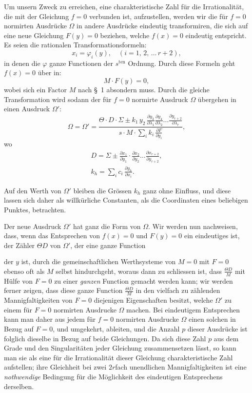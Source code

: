 \documentclass{article}
\begin{document}
Um unsern Zweck zu erreichen, eine charakteristische Zahl für die Irrationalität, die mit der Gleichung $f = 0$ verbunden ist, aufzustellen, werden wir die für $f = 0$ normirten Ausdrücke $\Omega$ in andere Ausdrücke eindeutig transformiren, die sich auf eine neue Gleichung $F(y) = 0$ beziehen, welche $f(x) = 0$ eindeutig entspricht. Es seien die rationalen Transformationsformeln:
\[
x_i = \varphi_i(y), \quad (i = 1,\, 2,\, \dots\, r+2),
\]
in denen die $\varphi$ ganze Functionen der $s^{\text{ten}}$ Ordnung. Durch diese Formeln geht $f(x) = 0$ über in:
\[
M \cdot F(y) = 0,
\]
wobei sich ein Factor $M$ nach §~1 absondern muss. Durch die gleiche Transformation wird sodann der für $f = 0$ normirte Ausdruck $\Omega$ übergehen in einen Ausdruck $\Omega'$:
\[
\Omega = \Omega' = \frac{\Theta \cdot D \cdot \Sigma \pm k_1\, y_2\, \frac{\partial y_3}{\partial \lambda_1} \frac{\partial y_4}{\partial \lambda_2} \dots \frac{\partial y_{r+2}}{\partial \lambda_r}}{s \cdot M \cdot \displaystyle\sum_i k_i\, \frac{\partial F}{\partial y_i}},
\]
wo
\[
\begin{gathered}
D = \Sigma \pm \frac{\partial x_1}{\partial y_1} \cdot \frac{\partial x_2}{\partial y_2} \dots \frac{\partial x_{r+2}}{\partial y_{r+2}}, \\
k_h = \sum_i c_i\, \frac{\partial y_h}{\partial x_i} .
\end{gathered}
\]

Auf den Werth von $\Omega'$ bleiben die Grössen $k_h$ ganz ohne Einfluss, und diese lassen sich daher als willkürliche Constanten, als die Coordinaten eines beliebigen Punktes, betrachten.

Der neue Ausdruck $\Omega'$ hat ganz die Form von $\Omega$. Wir werden nun nachweisen, dass, wenn das Entsprechen von $f(x) = 0$ und $F(y) = 0$ ein eindeutiges ist, der Zähler $\Theta D$ von $\Omega'$, der eine ganze Function

der $y$ ist, durch die gemeinschaftlichen Werthsysteme von $M = 0$ mit $F = 0$ ebenso oft als $M$ selbst hindurchgeht, woraus dann zu schliessen ist, dass $\frac{\Theta D}{M}$ mit Hülfe von $F = 0$ zu einer \emph{ganzen} Function gemacht werden kann; wir werden ferner zeigen, dass diese ganze Function $\frac{\Theta D}{M}$ in den vielfach zu zählenden Mannigfaltigkeiten von $F = 0$ diejenigen Eigenschaften besitzt, welche $\Omega'$ zu einem für $F = 0$ normirten Ausdrucke $\Omega$ machen. Bei eindeutigem Entsprechen kann man daher aus jedem für $f = 0$ normirten Ausdrucke $\Omega$ einen solchen in Bezug auf $F = 0$, und umgekehrt, ableiten, und die Anzahl $p$ dieser Ausdrücke ist folglich dieselbe in Bezug auf beide Gleichungen. Da sich diese Zahl $p$ aus dem Grade und den Singularitäten jeder Gleichung zusammensetzen lässt, so kann man sie als eine für die Irrationalität dieser Gleichung charakteristische Zahl aufstellen; ihre Gleichheit bei zwei $2r$fach unendlichen Mannigfaltigkeiten ist eine \emph{nothwendige} Bedingung für die Möglichkeit des eindeutigen Entsprechens derselben.
\end{document}
